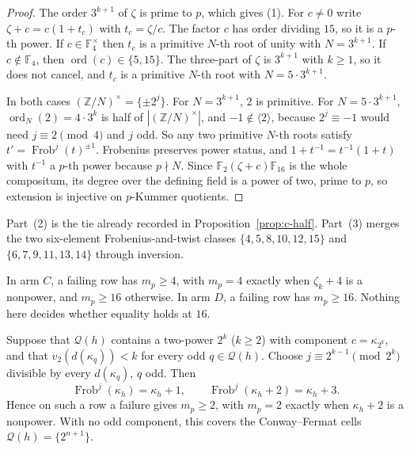\begin{proof}
The order $3^{k+1}$ of $\zeta$ is prime to $p$, which gives (1).  For
$c\ne0$ write $\zeta+c=c(1+t_c)$ with $t_c=\zeta/c$.  The factor $c$ has
order dividing $15$, so it is a $p$-th power.  If $c\in\mathbb F_4^{\times}$
then $t_c$ is a primitive $N$-th root of unity with $N=3^{k+1}$.  If
$c\notin\mathbb F_4$, then $\operatorname{ord}(c)\in\{5,15\}$.  The three-part
of $\zeta$ is $3^{k+1}$ with $k\geq1$, so it does not cancel, and $t_c$ is a
primitive $N$-th root with $N=5\cdot3^{k+1}$.

In both cases $(\mathbb Z/N)^{\times}=\{\pm2^j\}$.  For $N=3^{k+1}$, $2$ is
primitive.  For $N=5\cdot3^{k+1}$, $\operatorname{ord}_N(2)=4\cdot3^k$ is half
of $|(\mathbb Z/N)^{\times}|$, and $-1\notin\langle2\rangle$, because
$2^j\equiv-1$ would need $j\equiv2\pmod4$ and $j$ odd.  So any two
primitive $N$-th roots satisfy $t'=\operatorname{Frob}^j(t)^{\pm1}$.
Frobenius preserves power status, and $1+t^{-1}=t^{-1}(1+t)$ with $t^{-1}$ a
$p$-th power because $p\nmid N$.  Since $\mathbb F_2(\zeta+c)\mathbb F_{16}$
is the whole compositum, its degree over the defining field is a power of
two, prime to $p$, so extension is injective on $p$-Kummer quotients.
\end{proof}

Part~(2) is the tie already recorded in Proposition~\ref{prop:c-half}.
Part~(3) merges the two six-element Frobenius-and-twist classes
$\{4,5,8,10,12,15\}$ and $\{6,7,9,11,13,14\}$ through inversion.

\begin{corollary}\label{cor:model-fail-value}
In arm $C$, a failing row has $m_p\geq4$, with $m_p=4$ exactly when
$\zeta_k+4$ is a nonpower, and $m_p\geq16$ otherwise.  In arm $D$, a failing
row has $m_p\geq16$.  Nothing here decides whether equality holds at $16$.
\end{corollary}

\begin{lemma}\label{lem:model-z-tie}
Suppose that $\mathcal Q(h)$ contains a two-power $2^k$ ($k\geq2$) with
component $c=\kappa_{2^k}$, and that $v_2(d(\kappa_q))<k$ for every odd
$q\in\mathcal Q(h)$.  Choose $j\equiv2^{k-1}\pmod{2^k}$ divisible by every
$d(\kappa_q)$, $q$ odd.  Then
\[
 \operatorname{Frob}^j(\kappa_h)=\kappa_h+1,\qquad
 \operatorname{Frob}^j(\kappa_h+2)=\kappa_h+3.
\]
Hence on such a row a failure gives $m_p\geq2$, with $m_p=2$ exactly when
$\kappa_h+2$ is a nonpower.  With no odd component, this covers the
Conway--Fermat cells $\mathcal Q(h)=\{2^{n+1}\}$.
\end{lemma}

